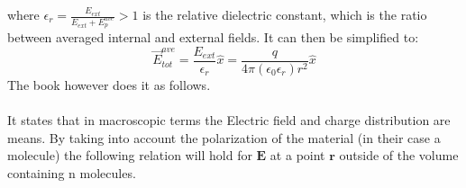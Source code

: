 where $\displaystyle \epsilon_r = \frac{E_{ext}}{E_{ext}+E_p^{ave}}>1 $ is the relative dielectric constant, which is the ratio between averaged internal and external fields. It can then be simplified to:
\begin{equation}
    \vec{E}_{t o t}^{a v e}=\frac{E_{e x t}}{\epsilon_{r}} \hat{x}=\frac{q}{4 \pi\left(\epsilon_{0} \epsilon_{r}\right) r^{2}} \hat{x}
\end{equation}
The book however does it as follows. \\
\\
It states that in macroscopic terms the Electric field and charge distribution are means. 
By taking into account the polarization of the material (in their case a molecule)  the following relation will hold for $\textbf{E}$ at a point $\textbf{r}$ outside of the volume containing n molecules.

